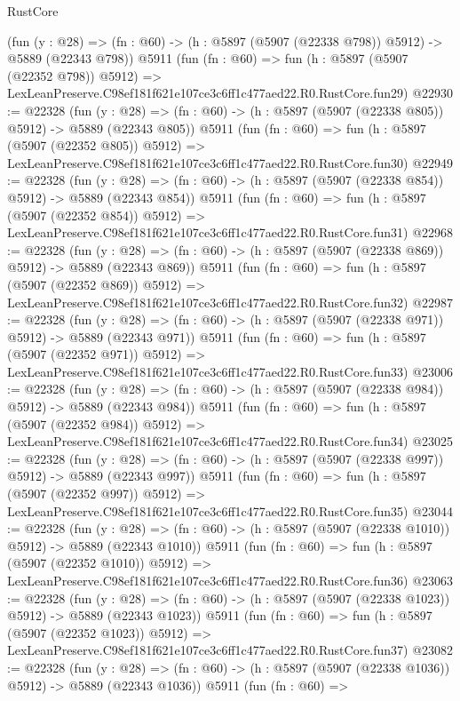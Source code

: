 \begin{lexlean}{RustCore}
\begin{coremodule}
    (fun (y : @28) => (fn : @60) -> (h : @5897 (@5907 (@22338 @798)) @5912) -> @5889 (@22343 @798))
    @5911
    (fun (fn : @60) =>
    fun (h : @5897 (@5907 (@22352 @798)) @5912) =>
    LexLeanPreserve.C98ef181f621e107ce3c6ff1c477aed22.R0.RustCore.fun29)
@22930 := @22328
    (fun (y : @28) => (fn : @60) -> (h : @5897 (@5907 (@22338 @805)) @5912) -> @5889 (@22343 @805))
    @5911
    (fun (fn : @60) =>
    fun (h : @5897 (@5907 (@22352 @805)) @5912) =>
    LexLeanPreserve.C98ef181f621e107ce3c6ff1c477aed22.R0.RustCore.fun30)
@22949 := @22328
    (fun (y : @28) => (fn : @60) -> (h : @5897 (@5907 (@22338 @854)) @5912) -> @5889 (@22343 @854))
    @5911
    (fun (fn : @60) =>
    fun (h : @5897 (@5907 (@22352 @854)) @5912) =>
    LexLeanPreserve.C98ef181f621e107ce3c6ff1c477aed22.R0.RustCore.fun31)
@22968 := @22328
    (fun (y : @28) => (fn : @60) -> (h : @5897 (@5907 (@22338 @869)) @5912) -> @5889 (@22343 @869))
    @5911
    (fun (fn : @60) =>
    fun (h : @5897 (@5907 (@22352 @869)) @5912) =>
    LexLeanPreserve.C98ef181f621e107ce3c6ff1c477aed22.R0.RustCore.fun32)
@22987 := @22328
    (fun (y : @28) => (fn : @60) -> (h : @5897 (@5907 (@22338 @971)) @5912) -> @5889 (@22343 @971))
    @5911
    (fun (fn : @60) =>
    fun (h : @5897 (@5907 (@22352 @971)) @5912) =>
    LexLeanPreserve.C98ef181f621e107ce3c6ff1c477aed22.R0.RustCore.fun33)
@23006 := @22328
    (fun (y : @28) => (fn : @60) -> (h : @5897 (@5907 (@22338 @984)) @5912) -> @5889 (@22343 @984))
    @5911
    (fun (fn : @60) =>
    fun (h : @5897 (@5907 (@22352 @984)) @5912) =>
    LexLeanPreserve.C98ef181f621e107ce3c6ff1c477aed22.R0.RustCore.fun34)
@23025 := @22328
    (fun (y : @28) => (fn : @60) -> (h : @5897 (@5907 (@22338 @997)) @5912) -> @5889 (@22343 @997))
    @5911
    (fun (fn : @60) =>
    fun (h : @5897 (@5907 (@22352 @997)) @5912) =>
    LexLeanPreserve.C98ef181f621e107ce3c6ff1c477aed22.R0.RustCore.fun35)
@23044 := @22328
    (fun (y : @28) =>
    (fn : @60) -> (h : @5897 (@5907 (@22338 @1010)) @5912) -> @5889 (@22343 @1010))
    @5911
    (fun (fn : @60) =>
    fun (h : @5897 (@5907 (@22352 @1010)) @5912) =>
    LexLeanPreserve.C98ef181f621e107ce3c6ff1c477aed22.R0.RustCore.fun36)
@23063 := @22328
    (fun (y : @28) =>
    (fn : @60) -> (h : @5897 (@5907 (@22338 @1023)) @5912) -> @5889 (@22343 @1023))
    @5911
    (fun (fn : @60) =>
    fun (h : @5897 (@5907 (@22352 @1023)) @5912) =>
    LexLeanPreserve.C98ef181f621e107ce3c6ff1c477aed22.R0.RustCore.fun37)
@23082 := @22328
    (fun (y : @28) =>
    (fn : @60) -> (h : @5897 (@5907 (@22338 @1036)) @5912) -> @5889 (@22343 @1036))
    @5911
    (fun (fn : @60) =>

\end{coremodule}
\end{lexlean}
